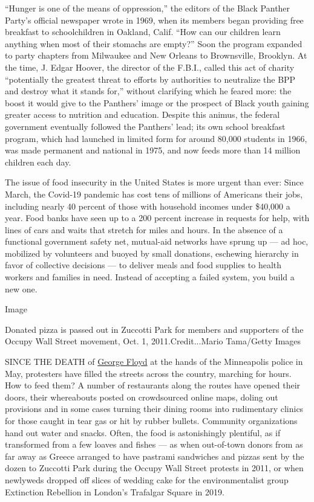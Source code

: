 ``Hunger is one of the means of oppression,'' the editors of the Black
Panther Party's official newspaper wrote in 1969, when its members began
providing free breakfast to schoolchildren in Oakland, Calif. ``How can
our children learn anything when most of their stomachs are empty?''
Soon the program expanded to party chapters from Milwaukee and New
Orleans to Brownsville, Brooklyn. At the time, J. Edgar Hoover, the
director of the F.B.I., called this act of charity ``potentially the
greatest threat to efforts by authorities to neutralize the BPP and
destroy what it stands for,'' without clarifying which he feared more:
the boost it would give to the Panthers' image or the prospect of Black
youth gaining greater access to nutrition and education. Despite this
animus, the federal government eventually followed the Panthers' lead;
its own school breakfast program, which had launched in limited form for
around 80,000 students in 1966, was made permanent and national in 1975,
and now feeds more than 14 million children each day.

The issue of food insecurity in the United States is more urgent than
ever: Since March, the Covid-19 pandemic has cost tens of millions of
Americans their jobs, including nearly 40 percent of those with
household incomes under \$40,000 a year. Food banks have seen up to a
200 percent increase in requests for help, with lines of cars and waits
that stretch for miles and hours. In the absence of a functional
government safety net, mutual-aid networks have sprung up --- ad hoc,
mobilized by volunteers and buoyed by small donations, eschewing
hierarchy in favor of collective decisions --- to deliver meals and food
supplies to health workers and families in need. Instead of accepting a
failed system, you build a new one.

Image

Donated pizza is passed out in Zuccotti Park for members and supporters
of the Occupy Wall Street movement, Oct. 1, 2011.Credit...Mario
Tama/Getty Images

SINCE THE DEATH of
\href{https://www.nytimes3xbfgragh.onion/2020/05/31/us/george-floyd-investigation.html}{George
Floyd} at the hands of the Minneapolis police in May, protesters have
filled the streets across the country, marching for hours. How to feed
them? A number of restaurants along the routes have opened their doors,
their whereabouts posted on crowdsourced online maps, doling out
provisions and in some cases turning their dining rooms into rudimentary
clinics for those caught in tear gas or hit by rubber bullets. Community
organizations hand out water and snacks. Often, the food is
astonishingly plentiful, as if transformed from a few loaves and fishes
--- as when out-of-town donors from as far away as Greece arranged to
have pastrami sandwiches and pizzas sent by the dozen to Zuccotti Park
during the Occupy Wall Street protests in 2011, or when newlyweds
dropped off slices of wedding cake for the environmentalist group
Extinction Rebellion in London's Trafalgar Square in 2019.


